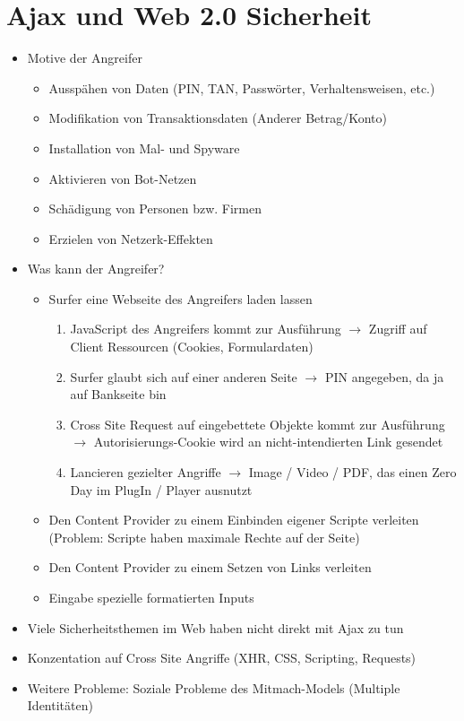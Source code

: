 \documentclass{article} %
\begin{document}
	\section{Ajax und Web 2.0 Sicherheit}
	\begin{itemize}
		\item Motive der Angreifer
		\begin{itemize}
			\item Ausspähen von Daten (PIN, TAN, Passwörter, Verhaltensweisen, etc.)
			\item Modifikation von Transaktionsdaten (Anderer Betrag/Konto)
			\item Installation von Mal- und Spyware
			\item Aktivieren von Bot-Netzen
			\item Schädigung von Personen bzw. Firmen
			\item Erzielen von Netzerk-Effekten
		\end{itemize}
		\item Was kann der Angreifer?
		\begin{itemize}
			\item Surfer eine Webseite des Angreifers laden lassen
			\begin{enumerate}
				\item JavaScript des Angreifers kommt zur Ausführung $\rightarrow$ Zugriff auf Client Ressourcen (Cookies, Formulardaten)
				\item Surfer glaubt sich auf einer anderen Seite $\rightarrow$ PIN angegeben, da ja auf Bankseite bin
				\item Cross Site Request auf eingebettete Objekte kommt zur Ausführung $\rightarrow$ Autorisierungs-Cookie wird an nicht-intendierten Link gesendet
				\item Lancieren gezielter Angriffe $\rightarrow$ Image / Video / PDF, das einen Zero Day im PlugIn / Player ausnutzt
			\end{enumerate}
			\item Den Content Provider zu einem Einbinden eigener Scripte verleiten (Problem: Scripte haben maximale Rechte auf der Seite)
			\item Den Content Provider zu einem Setzen von Links verleiten 
			\item Eingabe spezielle formatierten Inputs 
		\end{itemize}
		\item Viele Sicherheitsthemen im Web haben nicht direkt mit Ajax zu tun
		\item Konzentation auf Cross Site Angriffe (XHR, CSS, Scripting, Requests)
		\item Weitere Probleme: Soziale Probleme des Mitmach-Models (Multiple Identitäten)
	\end{itemize}
	
\end{document}
